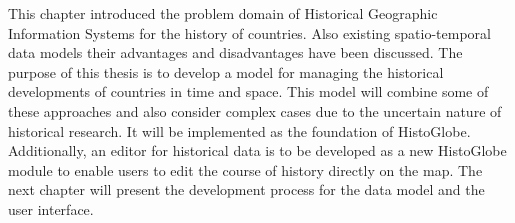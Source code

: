 \vspace{1.5em}

This chapter introduced the problem domain of Historical Geographic Information Systems for the history of countries. Also existing spatio-temporal data models their advantages and disadvantages have been discussed. The purpose of this thesis is to develop a model for managing the historical developments of countries in time and space. This model will combine some of these approaches and also consider complex cases due to the uncertain nature of historical research. It will be implemented as the foundation of HistoGlobe. Additionally, an editor for historical data is to be developed as a new HistoGlobe module to enable users to edit the course of history directly on the map. The next chapter will present the development process for the data model and the user interface.


